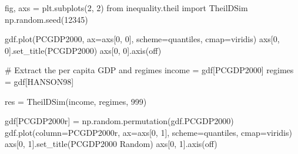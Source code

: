 \documentclass[
  a4paper, 
  twoside,
  final
]{article}
\newenvironment{Shaded}{\begin{snugshade}}{\end{snugshade}}
\newcommand{\CommentTok}[1]{\textcolor[rgb]{0.37,0.37,0.37}{#1}}
\newcommand{\DecValTok}[1]{\textcolor[rgb]{0.68,0.00,0.00}{#1}}
\newcommand{\ImportTok}[1]{\textcolor[rgb]{0.00,0.46,0.62}{#1}}
\newcommand{\NormalTok}[1]{\textcolor[rgb]{0.00,0.23,0.31}{#1}}
\newcommand{\OperatorTok}[1]{\textcolor[rgb]{0.37,0.37,0.37}{#1}}
\newcommand{\StringTok}[1]{\textcolor[rgb]{0.13,0.47,0.30}{#1}}
\begin{document}
\begin{Shaded}
\begin{Highlighting}[]
\NormalTok{fig, axs }\OperatorTok{=}\NormalTok{ plt.subplots(}\DecValTok{2}\NormalTok{, }\DecValTok{2}\NormalTok{)}
\ImportTok{from}\NormalTok{ inequality.theil }\ImportTok{import}\NormalTok{ TheilDSim}
\NormalTok{np.random.seed(}\DecValTok{12345}\NormalTok{)}

\NormalTok{gdf.plot(}\StringTok{\textquotesingle{}PCGDP2000\textquotesingle{}}\NormalTok{, ax}\OperatorTok{=}\NormalTok{axs[}\DecValTok{0}\NormalTok{, }\DecValTok{0}\NormalTok{], scheme}\OperatorTok{=}\StringTok{\textquotesingle{}quantiles\textquotesingle{}}\NormalTok{,}
\NormalTok{         cmap}\OperatorTok{=}\StringTok{\textquotesingle{}viridis\textquotesingle{}}\NormalTok{)}
\NormalTok{axs[}\DecValTok{0}\NormalTok{, }\DecValTok{0}\NormalTok{].set\_title(}\StringTok{\textquotesingle{}PCGDP2000\textquotesingle{}}\NormalTok{)}
\NormalTok{axs[}\DecValTok{0}\NormalTok{, }\DecValTok{0}\NormalTok{].axis(}\StringTok{\textquotesingle{}off\textquotesingle{}}\NormalTok{)}

\CommentTok{\# Extract the per capita GDP and regimes}
\NormalTok{income }\OperatorTok{=}\NormalTok{ gdf[}\StringTok{\textquotesingle{}PCGDP2000\textquotesingle{}}\NormalTok{]}
\NormalTok{regimes }\OperatorTok{=}\NormalTok{ gdf[}\StringTok{\textquotesingle{}HANSON98\textquotesingle{}}\NormalTok{]}

\NormalTok{res }\OperatorTok{=}\NormalTok{ TheilDSim(income, regimes, }\DecValTok{999}\NormalTok{)}

\NormalTok{gdf[}\StringTok{\textquotesingle{}PCGDP2000r\textquotesingle{}}\NormalTok{] }\OperatorTok{=}\NormalTok{ np.random.permutation(gdf.PCGDP2000)}
\NormalTok{gdf.plot(column}\OperatorTok{=}\StringTok{\textquotesingle{}PCGDP2000r\textquotesingle{}}\NormalTok{, ax}\OperatorTok{=}\NormalTok{axs[}\DecValTok{0}\NormalTok{, }\DecValTok{1}\NormalTok{], scheme}\OperatorTok{=}\StringTok{\textquotesingle{}quantiles\textquotesingle{}}\NormalTok{,}
\NormalTok{         cmap}\OperatorTok{=}\StringTok{\textquotesingle{}viridis\textquotesingle{}}\NormalTok{)}
\NormalTok{axs[}\DecValTok{0}\NormalTok{, }\DecValTok{1}\NormalTok{].set\_title(}\StringTok{\textquotesingle{}PCGDP2000 Random\textquotesingle{}}\NormalTok{)}
\NormalTok{axs[}\DecValTok{0}\NormalTok{, }\DecValTok{1}\NormalTok{].axis(}\StringTok{\textquotesingle{}off\textquotesingle{}}\NormalTok{)}




\end{Highlighting}
\end{Shaded}
\end{document}

